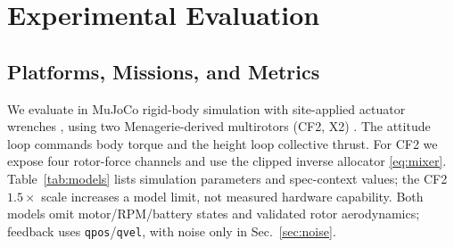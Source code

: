 \documentclass[letterpaper, 10 pt, conference]{ieeeconf}
\begin{document}
\section{Experimental Evaluation}
\label{sec:results}
\subsection{Platforms, Missions, and Metrics}

We evaluate in MuJoCo rigid-body simulation with site-applied actuator wrenches
\cite{todorov2012mujoco}, using two Menagerie-derived multirotors (CF2, X2)
\cite{menagerieModels}. The attitude loop commands body torque and the height loop
collective thrust. For CF2 we expose four rotor-force channels and use the clipped
inverse allocator \eqref{eq:mixer}. Table~\ref{tab:models} lists simulation parameters and
spec-context values; the CF2 $1.5\times$ scale increases a model limit, not measured
hardware capability. Both models omit motor/RPM/battery states and validated rotor
aerodynamics; feedback uses \texttt{qpos}/\texttt{qvel}, with noise only in
Sec.~\ref{sec:noise}.
\end{document}
